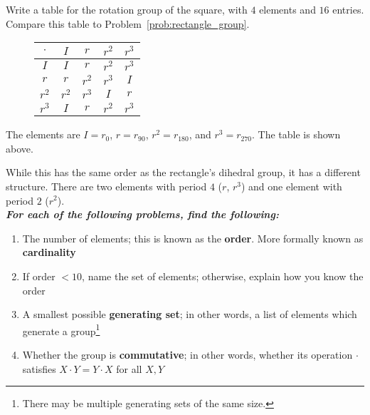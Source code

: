 \documentclass[../gatm_answers.tex]{subfiles}
\begin{document}
\begin{outer_problem}
\item Write a table for the rotation group of the square, with $4$ elements and $16$ entries. Compare this table to Problem~\ref{prob:rectangle_group}.
\end{outer_problem}

\begin{figure}[h]
	\begin{center}
		\begin{minipage}[b]{\textwidth}
			\centering
			\begin{tabular}{c|cccc}
				\hline
				$\cdot$ & $I$ & $r$ & $r^2$ & $r^3$ \\ \hline
				\rowcolor{light-gray}
				$I$ & $I$ & $r$ & $r^2$ & $r^3$ \\
				$r$ & $r$ & $r^2$ & $r^3$ & $I$ \\
				\rowcolor{light-gray}
				$r^2$ & $r^2$ & $r^3$ & $I$ & $r$ \\
				$r^3$ & $I$ & $r$ & $r^2$ & $r^3$ \\ \hline
			\end{tabular}
			\vspace*{0.5\baselineskip}
		\end{minipage}
	\end{center}
	\vspace*{-2\baselineskip}
\end{figure}%

\noindent The elements are $I=r_0$, $r=r_{90}$, $r^2=r_{180}$, and $r^3=r_{270}$. The table is shown above.

While this has the same order as the rectangle's dihedral group, it has a different structure. There are two elements with period $4$ ($r$, $r^3$) and one element with period $2$ ($r^2$).\\

\noindent\textbf{\textit{For each of the following problems, find the following:}}

\begin{enumerate}[label=(\alph*)]
\item The number of elements; this is known as the \textbf{order}. More formally known as \textbf{cardinality}
\item If order $< 10$, name the set of elements; otherwise, explain how you know the order
\item A smallest possible \textbf{generating set}; in other words, a list of elements which generate a group\footnote{There may be multiple generating sets of the same size.}
\item Whether the group is \textbf{commutative}; in other words, whether its operation $\cdot$ satisfies $X\cdot Y=Y\cdot X$ for all $X,Y$
\end{enumerate}
\end{document}
